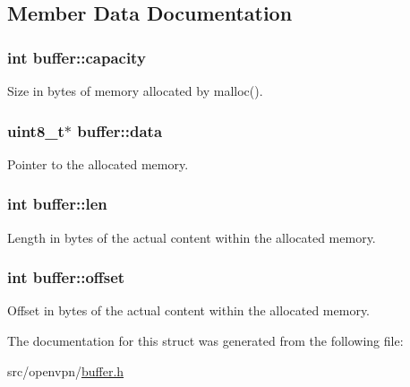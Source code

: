 \subsection{Member Data Documentation}
\hypertarget{structbuffer_a1fb6dcafc58a5ddc11c4d60c09a2e086}{}
\subsubsection[{capacity}]{\setlength{\rightskip}{0pt plus 5cm}int buffer\+::capacity}\label{structbuffer_a1fb6dcafc58a5ddc11c4d60c09a2e086}
Size in bytes of memory allocated by {\ttfamily malloc()}. \hypertarget{structbuffer_a5d2300c691699fd563f7a1a280c2c2d6}{}
\subsubsection[{data}]{\setlength{\rightskip}{0pt plus 5cm}uint8\+\_\+t$\ast$ buffer\+::data}\label{structbuffer_a5d2300c691699fd563f7a1a280c2c2d6}
Pointer to the allocated memory. \hypertarget{structbuffer_ada52eab703a091ff327114b3b3b0140a}{}
\subsubsection[{len}]{\setlength{\rightskip}{0pt plus 5cm}int buffer\+::len}\label{structbuffer_ada52eab703a091ff327114b3b3b0140a}
Length in bytes of the actual content within the allocated memory. \hypertarget{structbuffer_af5c1acadd937a2944674832497ba63ad}{}
\subsubsection[{offset}]{\setlength{\rightskip}{0pt plus 5cm}int buffer\+::offset}\label{structbuffer_af5c1acadd937a2944674832497ba63ad}
Offset in bytes of the actual content within the allocated memory. 

The documentation for this struct was generated from the following file\+:\begin{DoxyCompactItemize}
\item 
src/openvpn/\hyperlink{buffer_8h}{buffer.\+h}\end{DoxyCompactItemize}
